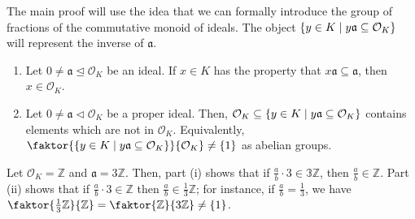 The main proof will use the idea that we can formally introduce the group of fractions of the commutative monoid of ideals.
The object \( \qty{y \in K \mid y\mathfrak a \subseteq \mathcal O_K} \) will represent the inverse of \( \mathfrak a \).
\begin{lemma}
    \begin{enumerate}
        \item Let \( 0 \neq \mathfrak a \trianglelefteq \mathcal O_K \) be an ideal.
        If \( x \in K \) has the property that \( x\mathfrak a \subseteq \mathfrak a \), then \( x \in \mathcal O_K \).
        \item Let \( 0 \neq \mathfrak a \triangleleft \mathcal O_K \) be a proper ideal.
        Then, \( \mathcal O_K \subseteq \qty{y \in K \mid y\mathfrak a \subseteq \mathcal O_K} \) contains elements which are not in \( \mathcal O_K \).
        Equivalently, \( \faktor{\qty{y \in K \mid y\mathfrak a \subseteq \mathcal O_K}}{\mathcal O_K} \neq \qty{1} \) as abelian groups.
    \end{enumerate}
\end{lemma}
\begin{example}
    Let \( \mathcal O_K = \mathbb Z \) and \( \mathfrak a = 3\mathbb Z \).
    Then, part (i) shows that if \( \frac{a}{b} \cdot 3 \in \mathbb 3\mathbb Z \), then \( \frac{a}{b} \in \mathbb Z \).
    Part (ii) shows that if \( \frac{a}{b} \cdot 3 \in \mathbb Z \) then \( \frac{a}{b} \in \frac{1}{3}\mathbb Z \); for instance, if \( \frac{a}{b} = \frac{1}{3} \), we have \( \faktor{\frac{1}{3}\mathbb Z}{\mathbb Z} = \faktor{\mathbb Z}{3\mathbb Z} \neq \qty{1} \).
\end{example}
